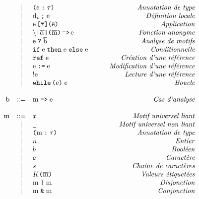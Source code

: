 \documentclass[a4paper,8pt]{article}
\newcommand{\comment}[1]{\hspace{3cm}\hfill \mbox{\textit{#1}}}
\newenvironment{BNF}[1][\linewidth]%
{\begin{math}\begin{array}{rclr}}%
{\end{array}\end{math}}%
\newcommand{\kwd}[1]{\texttt{#1}}
\newcommand{\rul}[1]{#1}
\newcommand{\car}[1]{\texttt{#1}}
\newcommand\type{\tau}
\newcommand\meta[1]{\textrm{#1}}
\newcommand\expr{\meta{e}}
\newcommand\vdefinition{\meta{d}_v}
\newcommand\tvar{\alpha}
\newcommand\id{x}
\newcommand\cid{K}
\newcommand\lint{n}
\newcommand\lchar{c}
\newcommand\lbool{b}
\newcommand\lstring{s}
\newcommand\pattern{\meta{m}}
\newcommand\branch{\meta{b}}
\newlength\codewidth
\newenvironment{code}[1][\codewidth]{
\begin{center}
\Sbox
\hspace{0.3cm}\minipage{#1}\small
}{
\endminipage
\endSbox\fbox{\TheSbox}
\end{center}
}
\newcommand\many[1]{\overline{#1}}
\begin{document}
\begin{code}[17cm]
\begin{BNF}
          &   | & \car{(} \rul{\expr} \;\car{:}\; \type \car{)} \comment{Annotation de type} \\
          &   | & \rul{\vdefinition} \,\car{;}\; \rul{\expr}
                  \comment{Définition locale} \\
          &   | & \rul{\expr} \, \car{[} \many\type \car{]} \car{(} \many{\rul{\expr}} \car{)} \comment{Application} \\
          &   | & \car{$\backslash$} \car{[} \many\tvar \car{]} \car{(} \many{\rul{\pattern}} \car{)} \,\car{=>}\, \rul{\expr}
                  \comment{Fonction anonyme} \\
          &   | & \rul{\expr} \; \car{?} \; \many{\branch}  \comment{Analyse de motifs} \\
          &   | & \kwd{if} \; \rul{\expr} \; \kwd{then} \; \rul{\expr} \; \kwd{else} \; \rul{\expr} \comment{Conditionnelle} \\
          &   | & \kwd{ref} \; \rul{\expr} \comment{Création d'une référence} \\
          &   | & \rul{\expr} \; \car{:=} \; \rul{\expr} \comment{Modification d'une référence} \\
          &   | & ! \rul{\expr} \comment{Lecture d'une référence} \\
          &   | & \kwd{while}\, \car{(} \rul{\expr} \car{)} \; \rul{\expr} \comment{Boucle} \\
\\
\branch    & $::=$ & \rul{\pattern} \;\car{=>}\; \rul{\expr} \comment{Cas d'analyse} \\
\\
\pattern & $::=$ & \id \comment{Motif universel liant}\\
          &   | & \car{\_} \comment{Motif universel non liant}\\
          &   | & \car{(} \rul{\pattern} \;\car{:}\; \type \car{)} \comment{Annotation de type} \\
          &   | & \lint \comment{Entier} \\
          &   | & \lbool \comment{Booléen} \\
          &   | & \lchar \comment{Caractère} \\
          &   | & \lstring \comment{Chaîne de caractères} \\
          &   | & \cid \car{(} \many{\rul{\pattern}} \car{)}
                  \comment{Valeurs étiquetées}\\
          &   | & \rul{\pattern} \;\car{|}\; \rul{\pattern} \comment{Disjonction} \\
          &   | & \rul{\pattern} \;\car{\&}\; \rul{\pattern} \comment{Conjonction} \\
\end{BNF}\smallskip
\end{code}
\end{document}
